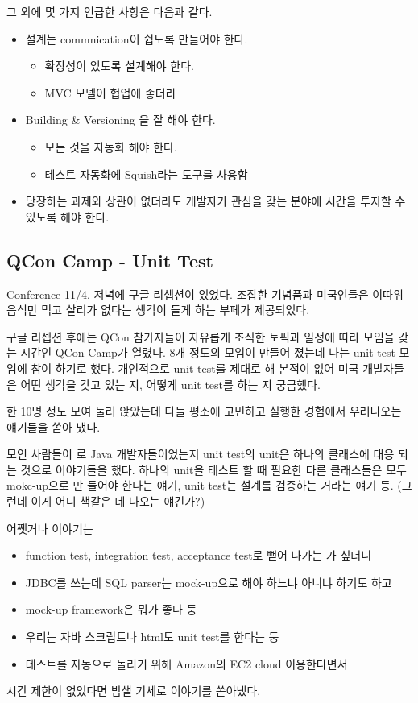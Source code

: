 \documentclass[11pt]{article}
\begin{document}
그 외에 몇 가지 언급한 사항은 다음과 같다.
\begin{itemize}
\item 설계는 commnication이 쉽도록 만들어야 한다.
    \begin{itemize}
    \item 확장성이 있도록 설계해야 한다.
    \item MVC 모델이 협업에 좋더라
    \end{itemize}
\item Building \& Versioning 을 잘 해야 한다.
    \begin{itemize}
    \item 모든 것을 자동화 해야 한다.
    \item 테스트 자동화에 Squish라는 도구를 사용함
    \end{itemize}
\item 당장하는 과제와 상관이 없더라도 개발자가 관심을 갖는 분야에 시간을 투자할 수 있도록 해야 한다.
\end{itemize}
 
\subsection{QCon Camp - Unit Test}

Conference 11/4. 저녁에 구글 리셉션이 있었다. 조잡한 기념품과 미국인들은
이따위 음식만 먹고 살리가 없다는 생각이 들게 하는 부페가 제공되었다.
 
구글 리셉션 후에는 QCon 참가자들이 자유롭게 조직한 토픽과 일정에 따라
모임을 갖는 시간인 QCon Camp가 열렸다. 8개 정도의 모임이 만들어 졌는데
나는 unit test 모임에 참여 하기로 했다.
개인적으로 unit test를 제대로 해 본적이 없어 미국 개발자들은 어떤
생각을 갖고 있는 지, 어떻게 unit test를 하는 지 궁금했다.
 
 
한 10명 정도 모여 둘러 앉았는데 다들 평소에 고민하고 실행한 경험에서
우러나오는 얘기들을 쏟아 냈다.
 
모인 사람들이 로 Java 개발자들이었는지 unit test의 unit은 하나의
클래스에 대응 되는 것으로 이야기들을 했다. 하나의 unit을 테스트 할 때
필요한 다른 클래스들은 모두 mokc-up으로 만 들어야 한다는 얘기, unit
test는 설계를 검증하는 거라는 얘기 등. 
(그런데 이게 어디 책같은 데 나오는 얘긴가?)
 
어쨋거나 이야기는 
\begin{itemize}
\item function test, integration test, acceptance test로 뻗어 나가는 가 싶더니 
\item JDBC를 쓰는데 SQL parser는  mock-up으로 해야 하느냐 아니냐 하기도 하고 
\item mock-up framework은 뭐가 좋다 둥 
\item 우리는 자바 스크립트나 html도 unit test를 한다는 둥
\item 테스트를 자동으로 돌리기 위해 Amazon의 EC2 cloud 이용한다면서 
\end{itemize}
시간 제한이 없었다면 밤샐 기세로 이야기를 쏟아냈다. 
\end{document}
